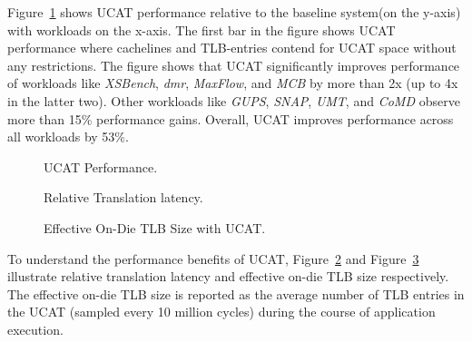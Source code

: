 
\noindent Figure~\ref{fig:perf_UCAT} shows UCAT performance relative
to the baseline system(on the y-axis) with workloads on the x-axis.
The first bar in the figure shows UCAT performance where cachelines
and TLB-entries contend for UCAT space without any restrictions. The
figure shows that UCAT significantly improves performance of workloads
like {\em XSBench}, {\em dmr}, {\em MaxFlow}, and {\em MCB} by more
than 2x (up to 4x in the latter two). Other workloads like {\em GUPS},
{\em SNAP}, {\em UMT}, and {\em CoMD} observe more than 15\%
performance gains. Overall, UCAT improves performance across all
workloads by 53\%.

\begin{figure}[tp] 
  \vspace{-0.in} \centering
  \centerline{}

  \caption{\small UCAT Performance. \normalsize}
  \label{fig:perf_UCAT} 
  \vspace{0.1 in}
\end{figure}

\begin{figure}[tp] 
  \vspace{0.1in} \centering
  \centerline{}

  \caption{\small Relative Translation latency.\normalsize}
  \label{fig:tlblat_UCAT} 
  \vspace{-0.0 in}
\end{figure}

\begin{figure}[tbh]
  \vspace{0.2in} \centering
  \centerline{}

  \caption{\small Effective On-Die TLB Size with UCAT.\normalsize}
  \label{fig:tlbsize_UCAT} 
  \vspace{-0.0 in}
\end{figure}

To understand the performance benefits of UCAT,
Figure~\ref{fig:tlblat_UCAT} and Figure~\ref{fig:tlbsize_UCAT}
illustrate relative translation latency and effective on-die TLB size
respectively. The effective on-die TLB size is reported as the average
number of TLB entries in the UCAT (sampled every 10 million cycles)
during the course of application execution.

